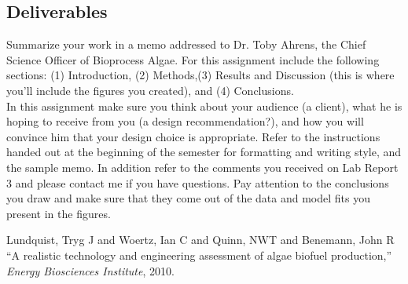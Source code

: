 \documentclass[12pt,letterpaper]{article}
\begin{document}
\subsection *{Deliverables}


Summarize your work in a memo addressed to Dr. Toby Ahrens, the Chief Science Officer of  Bioprocess Algae. For this assignment include the following sections: (1) Introduction, (2) Methods,(3) Results and Discussion (this is where you'll include the figures you created), and (4) Conclusions.\\ 

In this assignment make sure you think about your audience (a client), what he is hoping to receive from you (a design recommendation?), and how you will convince him that your design choice is appropriate. Refer to the instructions handed out at the beginning of the semester for  formatting and writing style, and the sample memo.  In addition refer to the comments you received on Lab Report 3 and please contact me if you have questions.  Pay attention to the conclusions you draw and make sure that they come out of the data and model fits you present in the figures.\\



\begin{thebibliography}{9}


Lundquist, Tryg J and Woertz, Ian C and Quinn, NWT and Benemann, John R
 ``A realistic technology and engineering assessment of algae biofuel production,''
  \emph{Energy Biosciences Institute}, 2010.


\end{thebibliography}
\end{document}

